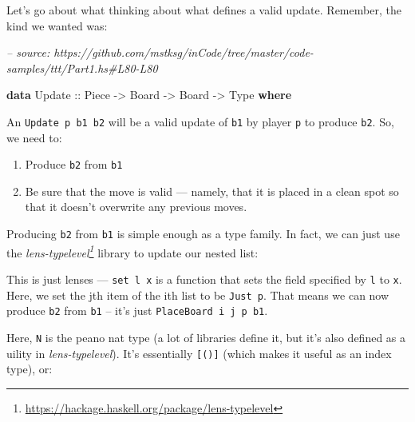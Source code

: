 \documentclass[]{article}
\newenvironment{Shaded}{}{}
\newcommand{\CommentTok}[1]{\textcolor[rgb]{0.38,0.63,0.69}{\textit{#1}}}
\newcommand{\DataTypeTok}[1]{\textcolor[rgb]{0.56,0.13,0.00}{#1}}
\newcommand{\FunctionTok}[1]{\textcolor[rgb]{0.02,0.16,0.49}{#1}}
\newcommand{\KeywordTok}[1]{\textcolor[rgb]{0.00,0.44,0.13}{\textbf{#1}}}
\newcommand{\NormalTok}[1]{#1}
\newcommand{\OtherTok}[1]{\textcolor[rgb]{0.00,0.44,0.13}{#1}}
\renewcommand{\href}[2]{#2\footnote{\url{#1}}}
\begin{document}
Let's go about what thinking about what defines a valid update. Remember, the
kind we wanted was:

\begin{Shaded}
\begin{Highlighting}[]
\CommentTok{-- source: https://github.com/mstksg/inCode/tree/master/code-samples/ttt/Part1.hs#L80-L80}

\KeywordTok{data} \DataTypeTok{Update}\OtherTok{ ::} \DataTypeTok{Piece} \OtherTok{->} \DataTypeTok{Board} \OtherTok{->} \DataTypeTok{Board} \OtherTok{->} \DataTypeTok{Type} \KeywordTok{where}
\end{Highlighting}
\end{Shaded}

An \texttt{Update\ p\ b1\ b2} will be a valid update of \texttt{b1} by player
\texttt{p} to produce \texttt{b2}. So, we need to:

\begin{enumerate}
\def\labelenumi{\arabic{enumi}.}
\tightlist
\item
  Produce \texttt{b2} from \texttt{b1}
\item
  Be sure that the move is valid --- namely, that it is placed in a clean spot
  so that it doesn't overwrite any previous moves.
\end{enumerate}

Producing \texttt{b2} from \texttt{b1} is simple enough as a type family. In
fact, we can just use the
\emph{\href{https://hackage.haskell.org/package/lens-typelevel}{lens-typelevel}}
library to update our nested list:

\begin{Shaded}
\end{Shaded}

This is just lenses --- \texttt{set\ l\ x} is a function that sets the field
specified by \texttt{l} to \texttt{x}. Here, we set the jth item of the ith list
to be \texttt{Just\ p}. That means we can now produce \texttt{b2} from
\texttt{b1} -- it's just \texttt{PlaceBoard\ i\ j\ p\ b1}.

Here, \texttt{N} is the peano nat type (a lot of libraries define it, but it's
also defined as a uility in \emph{lens-typelevel}). It's essentially
\texttt{{[}(){]}} (which makes it useful as an index type), or:
\end{document}
